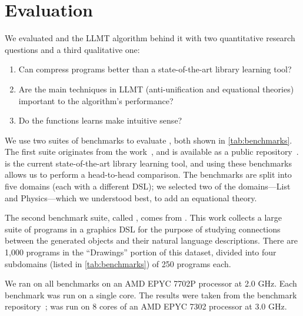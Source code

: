 \section{Evaluation}
\label{sec:eval}

We evaluated \tool and the LLMT algorithm behind it
 with two quantitative research questions and a third qualitative one:

\begin{enumerate}[label=RQ \arabic*.,ref=RQ \arabic*]
  \item Can \tool compress programs better than a state-of-the-art library learning tool?\label{rq:1}
  \item Are the main techniques in LLMT (anti-unification and equational theories)
        important to the algorithm's performance?\label{rq:2}
  \item Do the functions \tool learns make intuitive sense?\label{rq:3}
\end{enumerate}

We use two suites of benchmarks to evaluate \tool, both shown in \autoref{tab:benchmarks}.
%
The first suite originates from the \dc work~\cite{dreamcoder},
 and is available as a public repository~\cite{compression-bench}.
\dc is the current state-of-the-art library learning tool,
and using these benchmarks allows us to perform a head-to-head comparison.
%
The \dc benchmarks are split into five domains (each with a different DSL);
we selected two of the domains---List and Physics---which we understood best,
to add an equational theory.

The second benchmark suite, called \cogsci, comes from \citet{cogsci-dataset}.
This work collects a large suite of programs in a graphics DSL for the
 purpose of studying connections between the generated objects and their
 natural language descriptions.
There are 1,000 programs in the ``Drawings'' portion of this dataset,
 divided into four subdomains (listed in \autoref{tab:benchmarks})
 of 250 programs each.

We ran \tool on all benchmarks on an AMD EPYC 7702P processor at 2.0 GHz.
Each benchmark was run on a single core.
The \dc results were taken from
 the benchmark repository~\cite{compression-bench};
 \dc was run on 8 cores of an AMD EPYC 7302 processor at 3.0 GHz.


